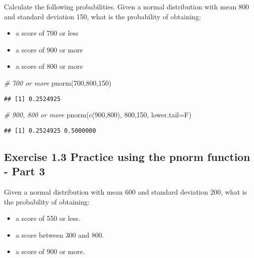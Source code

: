 \documentclass[
]{article}
\newenvironment{Shaded}{\begin{snugshade}}{\end{snugshade}}
\newcommand{\AttributeTok}[1]{\textcolor[rgb]{0.77,0.63,0.00}{#1}}
\newcommand{\CommentTok}[1]{\textcolor[rgb]{0.56,0.35,0.01}{\textit{#1}}}
\newcommand{\DecValTok}[1]{\textcolor[rgb]{0.00,0.00,0.81}{#1}}
\newcommand{\FunctionTok}[1]{\textcolor[rgb]{0.00,0.00,0.00}{#1}}
\newcommand{\NormalTok}[1]{#1}
\providecommand{\tightlist}{%
  \setlength{\itemsep}{0pt}\setlength{\parskip}{0pt}}
\begin{document}
Calculate the following probabilities. Given a normal distribution with
mean 800 and standard deviation 150, what is the probability of
obtaining:

\begin{itemize}
\tightlist
\item
  a score of 700 or less
\item
  a score of 900 or more
\item
  a score of 800 or more
\end{itemize}

\begin{Shaded}
\begin{Highlighting}[]
\CommentTok{\# 700 or more}
\FunctionTok{pnorm}\NormalTok{(}\DecValTok{700}\NormalTok{,}\DecValTok{800}\NormalTok{,}\DecValTok{150}\NormalTok{)}
\end{Highlighting}
\end{Shaded}

\begin{verbatim}
## [1] 0.2524925
\end{verbatim}

\begin{Shaded}
\begin{Highlighting}[]
\CommentTok{\# 900, 800 or more}
\FunctionTok{pnorm}\NormalTok{(}\FunctionTok{c}\NormalTok{(}\DecValTok{900}\NormalTok{,}\DecValTok{800}\NormalTok{), }\DecValTok{800}\NormalTok{,}\DecValTok{150}\NormalTok{, }\AttributeTok{lower.tail=}\NormalTok{F)}
\end{Highlighting}
\end{Shaded}

\begin{verbatim}
## [1] 0.2524925 0.5000000
\end{verbatim}

\hypertarget{exercise-1.3-practice-using-the-pnorm-function---part-3}{%
\subsection{Exercise 1.3 Practice using the pnorm function - Part
3}\label{exercise-1.3-practice-using-the-pnorm-function---part-3}}

Given a normal distribution with mean 600 and standard deviation 200,
what is the probability of obtaining:

\begin{itemize}
\tightlist
\item
  a score of 550 or less.
\item
  a score between 300 and 800.
\item
  a score of 900 or more.
\end{itemize}
\end{document}
